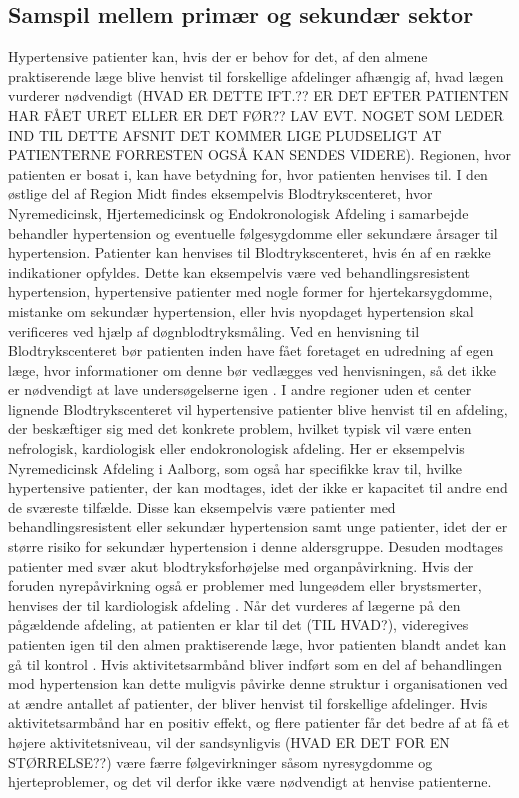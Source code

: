 \subsection{Samspil mellem primær og sekundær sektor}
Hypertensive patienter kan, hvis der er behov for det, af den almene praktiserende læge blive henvist til forskellige afdelinger afhængig af, hvad lægen vurderer nødvendigt (HVAD ER DETTE IFT.?? ER DET EFTER PATIENTEN HAR FÅET URET ELLER ER DET FØR?? LAV EVT. NOGET SOM LEDER IND TIL DETTE AFSNIT DET KOMMER LIGE PLUDSELIGT AT PATIENTERNE FORRESTEN OGSÅ KAN SENDES VIDERE). Regionen, hvor patienten er bosat i, kan have betydning for, hvor patienten henvises til. I den østlige del af Region Midt findes eksempelvis Blodtrykscenteret, hvor Nyremedicinsk, Hjertemedicinsk og Endokronologisk Afdeling i samarbejde behandler hypertension og eventuelle følgesygdomme eller sekundære årsager til hypertension. Patienter kan henvises til Blodtrykscenteret, hvis én af en række indikationer opfyldes. Dette kan eksempelvis være ved behandlingsresistent hypertension, hypertensive patienter med nogle former for hjertekarsygdomme, mistanke om sekundær hypertension, eller hvis nyopdaget hypertension skal verificeres ved hjælp af døgnblodtryksmåling. Ved en henvisning til Blodtrykscenteret bør patienten inden have fået foretaget en udredning af egen læge, hvor informationer om denne bør vedlægges ved henvisningen, så det ikke er nødvendigt at lave undersøgelserne igen \citep{aarhusuniversitetshopsital}. I andre regioner uden et center lignende Blodtrykscenteret vil hypertensive patienter blive henvist til en afdeling, der beskæftiger sig med det konkrete problem, hvilket typisk vil være enten nefrologisk, kardiologisk eller endokronologisk afdeling. Her er eksempelvis Nyremedicinsk Afdeling i Aalborg, som også har specifikke krav til, hvilke hypertensive patienter, der kan modtages, idet der ikke er kapacitet til andre end de sværeste tilfælde. Disse kan eksempelvis være patienter med behandlingsresistent eller sekundær hypertension samt unge patienter, idet der er større risiko for sekundær hypertension i denne aldersgruppe. Desuden modtages patienter med svær akut blodtryksforhøjelse med organpåvirkning. Hvis der foruden nyrepåvirkning også er problemer med lungeødem eller brystsmerter, henvises der til kardiologisk afdeling \citep{buur2011}. Når det vurderes af lægerne på den pågældende afdeling, at patienten er klar til det (TIL HVAD?), videregives patienten igen til den almen praktiserende læge, hvor patienten blandt andet kan gå til kontrol \citep{sundhedsstyrelsen2010, lodberg2016}.
Hvis aktivitetsarmbånd bliver indført som en del af behandlingen mod hypertension kan dette muligvis påvirke denne struktur i organisationen ved at ændre antallet af patienter, der bliver henvist til forskellige afdelinger. Hvis aktivitetsarmbånd har en positiv effekt, og flere patienter får det bedre af at få et højere aktivitetsniveau, vil der sandsynligvis (HVAD ER DET FOR EN STØRRELSE??) være færre følgevirkninger såsom nyresygdomme og hjerteproblemer, og det vil derfor ikke være nødvendigt at henvise patienterne. 


